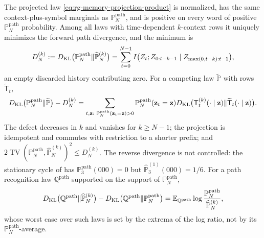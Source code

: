 The projected law \eqref{eq:rg-memory-projection-product} is normalized, has the same
context-plus-symbol marginals as $\mathbb P^{\mathrm{path}}_N$, and is positive on
every word of positive $\mathbb P^{\mathrm{path}}_N$ probability. Among all laws with
time-dependent $k$-context rows it uniquely minimizes the forward path divergence, and
the minimum is
\begin{equation}
D^{(k)}_N:=D_{\mathrm{KL}}\bigl(\mathbb P^{\mathrm{path}}_N\Vert\widehat{\mathbb P}^{(k)}_N\bigr)
=\sum_{t=0}^{N-1}I\bigl(Z_t;Z_{0:t-k-1}\mid Z_{\max(0,t-k):t-1}\bigr),
\label{eq:rg-memory-information-defect}
\end{equation}
an empty discarded history contributing zero. For a competing law
$\widetilde{\mathbb P}$ with rows $\widetilde{\mathsf T}_t$,
\begin{equation}
D_{\mathrm{KL}}\bigl(\mathbb P^{\mathrm{path}}_N\Vert\widetilde{\mathbb P}\bigr)-D^{(k)}_N
=\sum_{t,\mathbf z:\ \mathbb P^{\mathrm{path}}_N(\mathbf z_t=\mathbf z)>0}
\mathbb P^{\mathrm{path}}_N(\mathbf z_t=\mathbf z)
D_{\mathrm{KL}}\bigl(\mathsf T^{(k)}_t(\cdot\mid\mathbf z)\Vert\widetilde{\mathsf T}_t(\cdot\mid\mathbf z)\bigr).
\label{eq:rg-memory-excess-risk}
\end{equation}
The defect decreases in $k$ and vanishes for $k\ge N-1$; the projection is
idempotent and commutes with restriction to a shorter prefix; and
$2\operatorname{TV}(\mathbb P^{\mathrm{path}}_N,\widehat{\mathbb P}^{(k)}_N)^2\le D^{(k)}_N$.
The reverse divergence is not controlled: the stationary cycle of
 has $\mathbb P^{\mathrm{path}}_3(000)=0$ but
$\widehat{\mathbb P}^{(1)}_3(000)=1/6$. For a path recognition law $\mathbb
Q^{\mathrm{path}}$ supported on the support of $\mathbb P^{\mathrm{path}}_N$,
\begin{equation}
D_{\mathrm{KL}}\bigl(\mathbb Q^{\mathrm{path}}\Vert\widehat{\mathbb P}^{(k)}_N\bigr)
-D_{\mathrm{KL}}\bigl(\mathbb Q^{\mathrm{path}}\Vert\mathbb P^{\mathrm{path}}_N\bigr)
=\mathbb E_{\mathbb Q^{\mathrm{path}}}\log\frac{\mathbb P^{\mathrm{path}}_N}{\widehat{\mathbb P}^{(k)}_N},
\label{eq:rg-memory-recognition-vfe-difference}
\end{equation}
whose worst case over such laws is set by the extrema of the log ratio, not by its
$\mathbb P^{\mathrm{path}}_N$-average. 

